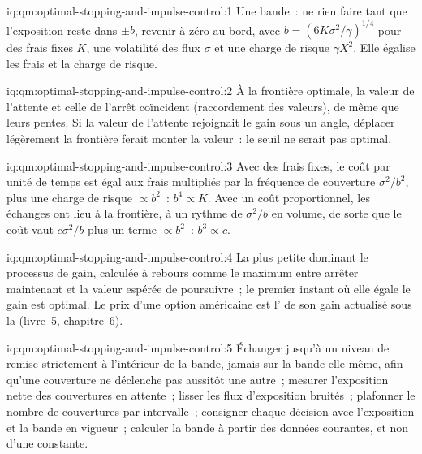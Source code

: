 \begin{solution}{iq:qm:optimal-stopping-and-impulse-control:1}
Une bande~: ne rien faire tant que l'exposition reste dans $\pm b$, revenir à zéro au bord, avec $b = (6K\sigma^2/\gamma)^{1/4}$ pour des frais fixes $K$, une volatilité des flux
$\sigma$ et une charge de risque $\gamma X^2$. Elle égalise les frais et la charge de risque.
\end{solution}

\begin{solution}{iq:qm:optimal-stopping-and-impulse-control:2}
À la frontière optimale, la valeur de l'attente et celle de l'arrêt coïncident (raccordement des valeurs), de même que leurs pentes. Si la valeur de l'attente
rejoignait le gain sous un angle, déplacer légèrement la frontière ferait monter la valeur~: le seuil ne serait pas optimal.
\end{solution}

\begin{solution}{iq:qm:optimal-stopping-and-impulse-control:3}
Avec des frais fixes, le coût par unité de temps est égal aux frais multipliés par la fréquence de couverture $\sigma^2/b^2$, plus une charge de risque $\propto b^2$~: $b^4 \propto K$. Avec un
coût proportionnel, les échanges ont lieu à la frontière, à un rythme de $\sigma^2/b$ en volume, de sorte que le coût vaut $c\sigma^2/b$ plus un terme $\propto b^2$~: $b^3 \propto c$.
\end{solution}

\begin{solution}{iq:qm:optimal-stopping-and-impulse-control:4}
La plus petite  dominant le processus de gain, calculée à rebours comme le maximum entre arrêter maintenant et la valeur espérée
de poursuivre~; le premier instant où elle égale le gain est optimal. Le prix d'une option américaine est l' de son gain actualisé sous la
 (livre~5, chapitre~6).
\end{solution}

\begin{solution}{iq:qm:optimal-stopping-and-impulse-control:5}
Échanger jusqu'à un niveau de remise strictement à l'intérieur de la bande, jamais sur la bande elle-même, afin qu'une couverture ne déclenche pas aussitôt une autre~;
mesurer l'exposition nette des couvertures en attente~; lisser les flux d'exposition bruités~; plafonner le nombre de couvertures par intervalle~; consigner chaque décision avec l'exposition et la bande en vigueur~;
calculer la bande à partir des données courantes, et non d'une constante.
\end{solution}

